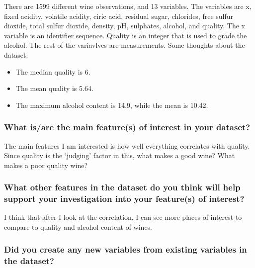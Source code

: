 \documentclass[]{article}
\providecommand{\tightlist}{%
  \setlength{\itemsep}{0pt}\setlength{\parskip}{0pt}}
\begin{document}
There are 1599 different wine observations, and 13 variables. The
variables are x, fixed acidity, volatile acidity, ciric acid, residual
sugar, chlorides, free sulfur dioxide, total sulfur dioxide, density,
pH, sulphates, alcohol, and quality. The x variable is an identifier
sequence. Quality is an integer that is used to grade the alcohol. The
rest of the variavlves are measurements. Some thoughts about the
dataset:

\begin{itemize}
\tightlist
\item
  The median quality is 6.
\item
  The mean quality is 5.64.
\item
  The maximum alcohol content is 14.9, while the mean is 10.42.
\end{itemize}

\hypertarget{what-isare-the-main-features-of-interest-in-your-dataset}{%
\subsubsection{What is/are the main feature(s) of interest in your
dataset?}\label{what-isare-the-main-features-of-interest-in-your-dataset}}

The main features I am interested is how well everything correlates with
quality. Since quality is the `judging' factor in this, what makes a
good wine? What makes a poor quality wine?

\hypertarget{what-other-features-in-the-dataset-do-you-think-will-help-support-your-investigation-into-your-features-of-interest}{%
\subsubsection{What other features in the dataset do you think will help
support your investigation into your feature(s) of
interest?}\label{what-other-features-in-the-dataset-do-you-think-will-help-support-your-investigation-into-your-features-of-interest}}

I think that after I look at the correlation, I can see more places of
interest to compare to quality and alcohol content of wines.

\hypertarget{did-you-create-any-new-variables-from-existing-variables-in-the-dataset}{%
\subsubsection{Did you create any new variables from existing variables
in the
dataset?}\label{did-you-create-any-new-variables-from-existing-variables-in-the-dataset}}
\end{document}
